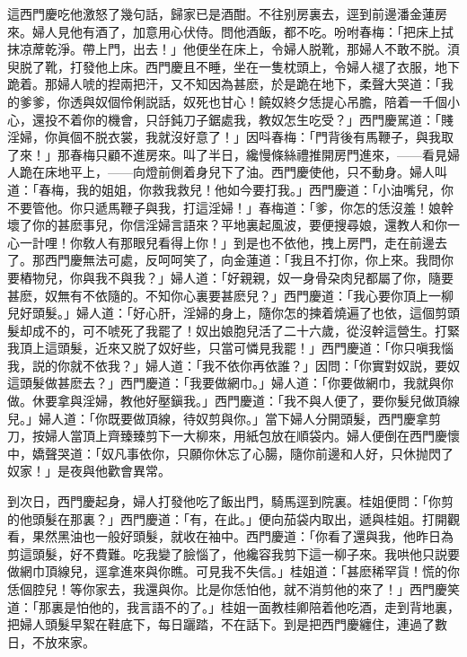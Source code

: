 這西門慶吃他激怒了幾句話，歸家已是酒酣。不往别房裏去，逕到前邊潘金蓮房來。婦人見他有酒了，加意用心伏侍。問他酒飯，都不吃。吩咐春梅：「把床上拭抹凉蓆乾淨。帶上門，出去！」他便坐在床上，令婦人脱靴，那婦人不敢不脱。湏臾脱了靴，打發他上床。西門慶且不睡，坐在一隻枕頭上，令婦人褪了衣服，地下跪着。那婦人唬的揑兩把汗，又不知因為甚麽，於是跪在地下，柔聲大哭道：「我的爹爹，你透與奴個伶俐説話，奴死也甘心！饒奴終夕恁提心吊膽，陪着一千個小心，還投不着你的機會，只㧱鈍刀子鋸處我，教奴怎生吃受？」西門慶駡道：「賤淫婦，你眞個不脱衣裳，我就沒好意了！」因呌春梅：「門背後有馬鞭子，與我取了來！」那春梅只顧不進房來。叫了半日，纔慢條絲禮推開房門進來，——看見婦人跪在床地平上，——向燈前側着身兒下了油。西門慶使他，只不動身。婦人叫道：「春梅，我的姐姐，你救我救兒！他如今要打我。」西門慶道：「小油嘴兒，你不要管他。你只遞馬鞭子與我，打這淫婦！」春梅道：「爹，你怎的恁沒羞！娘幹壞了你的甚麽事兒，你信淫婦言語來？平地裏起風波，要便搜尋娘，還教人和你一心一計哩！你敎人有那眼兒看得上你！」到是也不依他，拽上房門，走在前邊去了。那西門慶無法可處，反呵呵笑了，向金蓮道：「我且不打你，你上來。我問你要樁物兒，你與我不與我？」婦人道：「好親親，奴一身骨朶肉兒都屬了你，隨要甚麽，奴無有不依隨的。不知你心裏要甚麽兒？」西門慶道：「我心要你頂上一柳兒好頭髮。」婦人道：「好心肝，淫婦的身上，隨你怎的揀着燒遍了也依，這個剪頭髮却成不的，可不唬死了我罷了！奴出娘胞兒活了二十六歲，從沒幹這營生。打緊我頂上這頭髮，近來又脱了奴好些，只當可憐見我罷！」西門慶道：「你只嗔我惱我，説的你就不依我？」婦人道：「我不依你再依誰？」因問：「你實對奴説，要奴這頭髮做甚麽去？」西門慶道：「我要做網巾。」婦人道：「你要做網巾，我就與你做。休要拿與淫婦，教他好壓鎭我。」西門慶道：「我不與人便了，要你髮兒做頂線兒。」婦人道：「你既要做頂線，待奴剪與你。」當下婦人分開頭髮，西門慶拿剪刀，按婦人當頂上齊臻臻剪下一大柳來，用紙包放在順袋内。婦人便倒在西門慶懷中，嬌聲哭道：「奴凡事依你，只願你休忘了心腸，隨你前邊和人好，只休抛閃了奴家！」是夜與他歡會異常。

到次日，西門慶起身，婦人打發他吃了飯出門，騎馬逕到院裏。桂姐便問：「你剪的他頭髮在那裏？」西門慶道：「有，在此。」便向茄袋内取出，遞與桂姐。打開觀看，果然黑油也一般好頭髮，就收在袖中。西門慶道：「你看了還與我，他昨日為剪這頭髮，好不費難。吃我變了臉惱了，他纔容我剪下這一柳子來。我哄他只説要做網巾頂線兒，逕拿進來與你瞧。可見我不失信。」桂姐道：「甚麽稀罕貨！慌的你恁個腔兒！等你家去，我還與你。比是你恁怕他，就不消剪他的來了！」西門慶笑道：「那裏是怕他的，我言語不的了。」桂姐一面教桂卿陪着他吃酒，走到背地裏，把婦人頭髮早絮在鞋底下，每日躧踏，不在話下。到是把西門慶纏住，連過了數日，不放來家。

